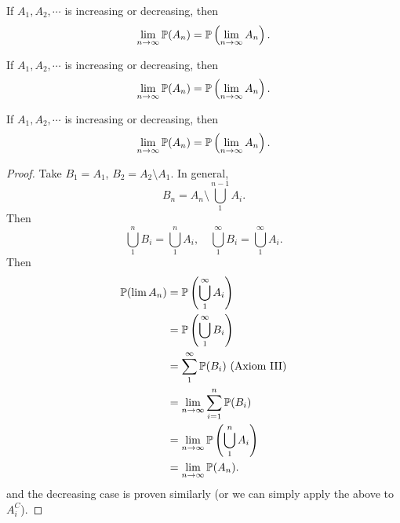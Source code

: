 \begin{note}
  \begin{field}
    \begin{thm}
      If $A_1, A_2, \cdots$ is increasing or decreasing, then
      \[
        \lim_{n\to \infty} \P(A_n) = \P\left(\lim_{n\to \infty} A_n\right).
      \]
    \end{thm}
  \end{field}
  \begin{field}
    \begin{thm}
      If $A_1, A_2, \cdots$ is increasing or decreasing, then
      \[
        \lim_{n\to \infty} \P(A_n) = \P\left(\lim_{n\to \infty} A_n\right).
      \]
    \end{thm}
  \end{field}
  \xplain{}%
\end{note}

%
\begin{note}
  \begin{field}
    \begin{thm}
      If $A_1, A_2, \cdots$ is increasing or decreasing, then
      \[
        \lim_{n\to \infty} \P(A_n) = \P\left(\lim_{n\to \infty} A_n\right).
      \]
    \end{thm}
  \end{field}
  \begin{field}
    \begin{proof}
      Take $B_1 = A_1$, $B_2 = A_2\setminus A_1$. In general,
      \[
        B_n = A_n\setminus\bigcup_1^{n - 1}A_i.
      \]
      Then
      \[
        \bigcup_1^n B_i = \bigcup_1^n A_i,\quad \bigcup_1^\infty B_i = \bigcup _1^\infty A_i.
      \]
      Then
      \begin{align*}
        \P(\lim A_n) &= \P\left(\bigcup_1^\infty A_i\right)\\
      &= \P\left(\bigcup_1^\infty B_i\right)\\
      &=\sum_1^\infty \P(B_i)\text{ (Axiom III)}\\
      &= \lim_{n \to \infty}\sum_{i = 1}^n \P(B_i)\\
      &= \lim_{n \to \infty} \P\left(\bigcup_1^n A_i\right)\\
      &= \lim_{n \to \infty} \P(A_n).
      \end{align*}
      and the decreasing case is proven similarly (or we can simply apply the above to $A_i^C$).
    \end{proof}
  \end{field}
  \xplain{}%
\end{note}

